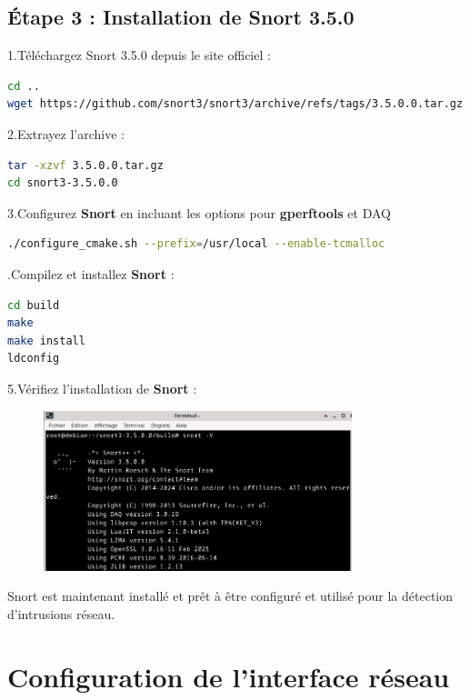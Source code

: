 \documentclass[12pt]{article}
\begin{document}
\subsection*{Étape 3 : Installation de Snort 3.5.0}

1.Téléchargez Snort 3.5.0 depuis le site officiel :
\begin{lstlisting}[language=bash]
cd ..
wget https://github.com/snort3/snort3/archive/refs/tags/3.5.0.0.tar.gz
\end{lstlisting}

2.Extrayez l’archive :
\begin{lstlisting}[language=bash]
tar -xzvf 3.5.0.0.tar.gz
cd snort3-3.5.0.0
\end{lstlisting}

3.Configurez \textbf{Snort} en incluant les options pour \textbf{gperftools} et DAQ
\begin{lstlisting}[language=bash]
./configure_cmake.sh --prefix=/usr/local --enable-tcmalloc
\end{lstlisting}

.Compilez et installez \textbf{Snort} :
\begin{lstlisting}[language=bash]
cd build
make
make install
ldconfig
\end{lstlisting}

5.Vérifiez l’installation de \textbf{Snort} :
\begin{figure}[H] 
    \centering
    \includegraphics[width=0.8\textwidth]{captures/Pasted image 20250603104154.png}
    \label{fig:mon_image}
\end{figure}

\vspace{0.5cm}
\noindent Snort est maintenant installé et prêt à être configuré et utilisé pour la détection d’intrusions réseau.

\section{Configuration de l’interface réseau}
\end{document}
